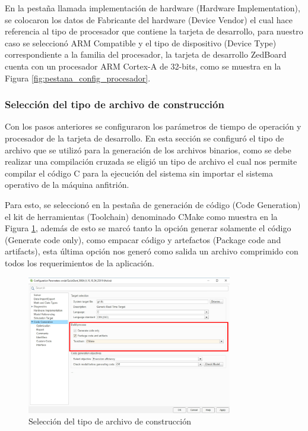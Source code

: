 En la pestaña llamada implementación de hardware (Hardware Implementation), se colocaron los datos de Fabricante del hardware (Device Vendor) el cual hace referencia al tipo de procesador que contiene la tarjeta de desarrollo, para nuestro caso se seleccionó ARM Compatible y el tipo de dispositivo (Device Type) correspondiente a la familia del procesador, la tarjeta de desarrollo ZedBoard cuenta con un procesador ARM Cortex-A de 32-bits, como se muestra en la Figura \ref{fig:pestana_config_procesador}.


\subsubsection{Selección del tipo de archivo de construcción}

Con los pasos anteriores se configuraron los parámetros de tiempo de operación y procesador de la tarjeta de desarrollo. En esta sección se configuró el tipo de archivo que se utilizó para la generación de los archivos binarios, como se debe realizar una compilación cruzada se eligió un tipo de archivo el cual nos permite compilar el código C para la ejecución del sistema sin importar el sistema operativo de la máquina anfitrión. 

Para esto, se seleccionó en la pestaña de generación de código (Code Generation) el kit de herramientas (Toolchain) denominado CMake como muestra en la Figura \ref{fig:pestana_config_output_file}, además de esto se marcó tanto la opción generar solamente el código (Generate code only), como empacar código y artefactos (Package code and artifacts), esta última opción nos generó como salida un archivo comprimido con todos los requerimientos de la aplicación.


\begin{figure}[h!]
    \centering
    \includegraphics[width=0.8\textwidth]{fig/especifico_2/M2MT/paso_a_paso_mtmt/configuration_output_file.pdf}
    \caption{Selección del tipo de archivo de construcción}
    \label{fig:pestana_config_output_file}
\end{figure}

